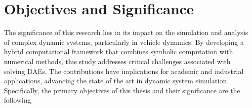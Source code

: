 
\section{Objectives and Significance}

The significance of this research lies in its impact on the simulation and analysis of complex dynamic systems, particularly in vehicle dynamics. By developing a hybrid computational framework that combines symbolic computation with numerical methods, this study addresses critical challenges associated with solving \acp{DAE}. The contributions have implications for academic and industrial applications, advancing the state of the art in dynamic system simulation. Specifically, the primary objectives of this thesis and their significance are the following.

